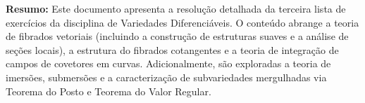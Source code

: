 \begin{center}
\end{center}

\begin{tcolorbox}[
	enhanced,
	sharp corners,
	boxrule=0.5pt,
	colback=white, 
	colframe=black,         
	width=1\textwidth,
	]%
	\textbf{Resumo:} Este documento apresenta a resolução detalhada da terceira lista de exercícios da disciplina de Variedades Diferenciáveis. O conteúdo abrange a teoria de fibrados vetoriais (incluindo a construção de estruturas suaves e a análise de seções locais), a estrutura do fibrados cotangentes e a teoria de integração de campos de covetores em curvas. Adicionalmente, são exploradas a teoria de imersões, submersões e a caracterização de subvariedades mergulhadas via Teorema do Posto e Teorema do Valor Regular.
\end{tcolorbox}


